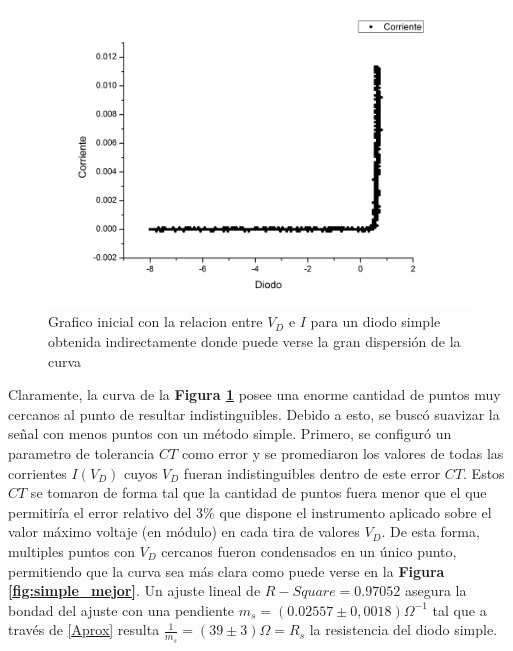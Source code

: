 \documentclass[11pt,a4paper]{article}
\begin{document}
\begin{figure}[H]
\centering
\includegraphics[scale=0.36]{simple_feo}
   \caption{Grafico inicial con la relacion entre $V_D$ e $I$ para un diodo simple obtenida indirectamente donde puede verse la gran dispersión de la curva}
   \label{fig:simple_feo}
\end{figure}

Claramente, la curva de la \textbf{Figura \ref{fig:simple_feo}} posee una enorme cantidad de puntos muy cercanos al punto de resultar indistinguibles. Debido a esto, se buscó suavizar la señal con menos puntos con un método simple. Primero, se configuró un parametro de tolerancia $CT$ como error y se promediaron los valores de todas las corrientes $I(V_D)$ cuyos $V_D$ fueran indistinguibles dentro de este error $CT$. Estos $CT$ se tomaron de forma tal que la cantidad de puntos fuera menor que el que permitiría el error relativo del 3\% que dispone el instrumento aplicado sobre el valor máximo voltaje (en módulo) en cada tira de valores $V_D$. De esta forma, multiples puntos con $V_D$ cercanos fueron condensados en un único punto, permitiendo que la curva sea más clara como puede verse en la \textbf{Figura \ref{fig:simple_mejor}}. Un ajuste lineal de $R-Square = 0.97052$ asegura la bondad del ajuste con una pendiente $m_s = (0.02557 \pm 0,0018)\Omega^{-1}$ tal que a través de \eqref{Aprox} resulta $\frac{1}{m_s} = (39 \pm 3)\Omega= R_s$ la resistencia del diodo simple.
\end{document}
